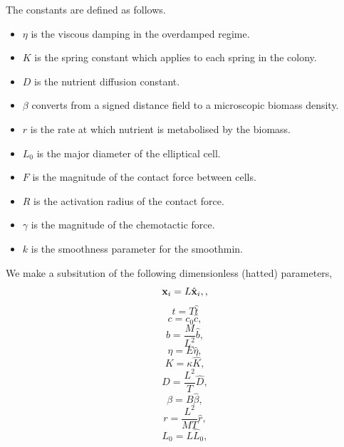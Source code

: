 The constants are defined as follows. 
\begin{itemize}
    \item $\eta$ is the viscous damping in the overdamped regime.
    \item $K$ is the spring constant which applies to each spring in the colony.
    \item $D$ is the nutrient diffusion constant.
    \item $\beta$ converts from a signed distance field to a microscopic biomass density.
    \item $r$ is the rate at which nutrient is metabolised by the biomass.
    \item $L_0$ is the major diameter of the elliptical cell.
    \item $F$ is the magnitude of the contact force between cells.
    \item $R$ is the activation radius of the contact force.
    \item $\gamma$ is the magnitude of the chemotactic force.
    \item $k$ is the smoothness parameter for the smoothmin.
\end{itemize}
We make a subsitution of the following dimensionless (hatted) parameters,
\begin{equation*}
    \vb{x}_i = L\hat{\vb{x}}_i,,
\end{equation*}
\begin{equation*}
    t = T\hat{t}
\end{equation*}
\begin{equation*}
    c = c_0 \hat{c},
\end{equation*}
\begin{equation*}
    b = \frac{M}{L^2}\hat{b},
\end{equation*}
\begin{equation*}
    \eta = E \hat{\eta},
\end{equation*}
\begin{equation*}
    K = \kappa \hat{K},
\end{equation*}
\begin{equation*}
    D = \frac{L^2}{T} \hat{D},
\end{equation*}
\begin{equation*}
    \beta = B \hat{\beta},
\end{equation*}
\begin{equation*}
    r = \frac{L^2}{M T} \hat{r},
\end{equation*}
\begin{equation*}
    L_0 = L \hat{L}_0,
\end{equation*}
